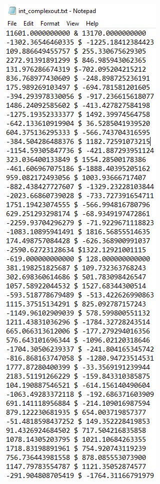 \documentclass[12pt, titlepage]{article}
\begin{document}
\begin{figure}[h!]
\centering
\begin{minipage}[b]{0.44\textwidth}
 \includegraphics[width=\textwidth]{Output_Complex}

\end{minipage}
\end{figure}
\end{document}
